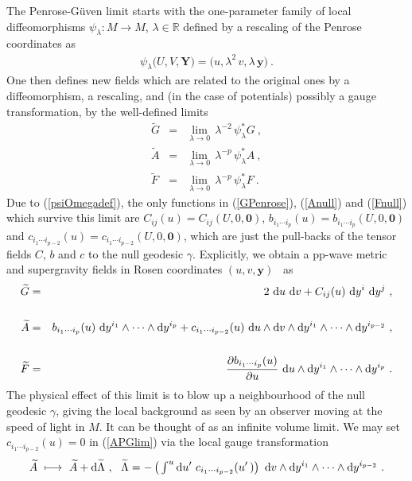 \documentclass[11pt,a4paper]{article}
\newcommand{\mbf}[1]{{\boldsymbol {#1} }}
\def\dd{{\rm d}}
\newcommand{\real}{{\mathbb R}} %
\def\nn{\nonumber}
\def\bea{\begin{eqnarray}}
\def\eea{\end{eqnarray}}
\newcommand{\beq}{\begin{eqnarray}}
\newcommand{\eeq}{\end{eqnarray}}
\begin{document}
The Penrose-G\"uven limit starts with the one-parameter family of
local diffeomorphisms $\psi_\lambda:M\to M$, $\lambda\in\real$ defined
by a rescaling of the Penrose coordinates as
\beq
\psi_\lambda\bigl(U,V,\mbf Y\bigr)=\bigl(u,\lambda^2\,v,
\lambda\,\mbf y\bigr) \ .
\label{psiOmegadef}\eeq
One then defines new fields which are related to the original ones by
a diffeomorphism, a rescaling, and (in the case of potentials) possibly
a gauge transformation, by the well-defined limits
\bea
\widetilde{G}&=&\lim_{\lambda\to0}\,\lambda^{-2}\,\psi^*_\lambda G \ ,
\nn\\\widetilde{A}&=&\lim_{\lambda\to0}\,\lambda^{-p}\,\psi^*_\lambda A
\ , \nn\\\widetilde{F}&=&\lim_{\lambda\to0}\,\lambda^{-p}\,\psi^*_\lambda
F \ .
\label{PGlimitsdef}\eea
Due to (\ref{psiOmegadef}), the only functions in (\ref{GPenrose}),
(\ref{Anull}) and (\ref{Fnull}) which survive this limit are
$C_{ij}(u)=C_{ij}(U,0,\mbf0)$, $b_{i_1\cdots i_p}(u)=b_{i_1\cdots
  i_p}(U,0,\mbf0)$ and $c_{i_1\cdots i_{p-2}}(u)=c_{i_1\cdots
  i_{p-2}}(U,0,\mbf0)$, which are just the pull-backs of the tensor fields $C$,
$b$ and $c$ to the null geodesic $\gamma$. Explicitly, we
obtain a pp-wave metric and supergravity fields in Rosen
coordinates $(u,v,\mbf y)$~\cite{Rosen1} as
\bea
\widetilde{G}&=&2~\dd u~\dd v+C_{ij}(u)~\dd y^i~\dd y^j \ ,
\label{GPGlim}\\&&{~~~~}_{~~}^{~~}\nn\\
\widetilde{A}&=&b_{i_1\cdots i_p}(u)~\dd y^{i_1}
\wedge\cdots\wedge\dd y^{i_p}+c_{i_1\cdots i_{p-2}}(u)~\dd u
\wedge\dd v\wedge\dd y^{i_1}\wedge\cdots\wedge\dd y^{i_{p-2}} \ ,
\label{APGlim}\\&&{~~~~}_{~~}^{~~}\nn\\
\widetilde{F}&=&\frac{\partial b_{i_1\cdots i_p}(u)}
{\partial u}~\dd u\wedge\dd y^{i_1}\wedge\cdots\wedge\dd y^{i_p} \ .
\label{FPGlim}\eea
The physical effect of this limit is to blow up a neighbourhood of the
null geodesic $\gamma$, giving the local background as seen by an
observer moving at the speed of light in $M$. It can be thought of as
an infinite volume limit. We may set $c_{i_1\cdots i_{p-2}}(u)=0$ in
(\ref{APGlim}) via the local gauge transformation
\beq
\widetilde{A}~\longmapsto~\widetilde{A}+\dd\widetilde{\Lambda} \ , ~~
\widetilde{\Lambda}=-\left(\,\mbox{$\int^u$}\,\dd u'~c_{i_1\cdots
    i_{p-2}}(u'\,)\right)~\dd v\wedge\dd y^{i_1}\wedge\cdots\wedge
\dd y^{i_{p-2}} \ .
\label{APGcset0}\eeq
\end{document}
